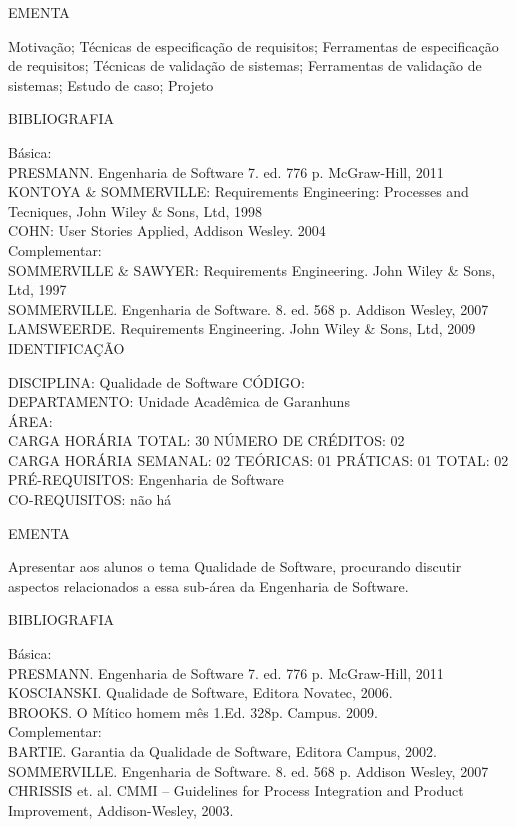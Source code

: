 \documentclass[
	12pt,				%
	openright,			%
  oneside,     %
	a4paper,			%
	chapter=TITLE,		%
	english,			%
	french,				%
	spanish,			%
	brazil				%
	]{abntex2}
\begin{document}
\begin{apendicesenv}
EMENTA 

Motivação; Técnicas de especificação de requisitos; Ferramentas de especificação de requisitos; Técnicas de validação de sistemas; Ferramentas de validação de sistemas; Estudo de caso; Projeto

BIBLIOGRAFIA 

Básica:\\
PRESMANN. Engenharia de Software 7. ed. 776 p. McGraw-Hill, 2011\\
KONTOYA \& SOMMERVILLE: Requirements Engineering: Processes and
Tecniques, John Wiley \& Sons, Ltd, 1998\\
COHN: User Stories Applied, Addison Wesley. 2004\\
Complementar:\\
SOMMERVILLE \& SAWYER: Requirements Engineering. John Wiley \& Sons,
Ltd, 1997 \\
SOMMERVILLE. Engenharia de Software. 8. ed. 568 p. Addison Wesley, 2007\\
LAMSWEERDE. Requirements Engineering. John Wiley \& Sons, Ltd, 2009\\

\newpage IDENTIFICAÇÃO

DISCIPLINA: Qualidade de Software CÓDIGO:\\ 
DEPARTAMENTO: Unidade Acadêmica de Garanhuns\\
ÁREA: \\
CARGA HORÁRIA TOTAL: 30 NÚMERO DE CRÉDITOS: 02\\
CARGA HORÁRIA SEMANAL: 02 TEÓRICAS: 01 PRÁTICAS: 01 TOTAL: 02\\
PRÉ-REQUISITOS: Engenharia de Software\\
CO-REQUISITOS: não há

EMENTA 

Apresentar aos alunos o tema Qualidade de Software, procurando discutir
aspectos relacionados a essa sub-área da Engenharia de Software.

BIBLIOGRAFIA 

Básica:\\
PRESMANN. Engenharia de Software 7. ed. 776 p. McGraw-Hill, 2011\\
KOSCIANSKI. Qualidade de Software, Editora Novatec, 2006.\\
BROOKS. O Mítico homem mês 1.Ed. 328p. Campus. 2009.\\
Complementar:\\
BARTIE. Garantia da Qualidade de Software, Editora Campus, 2002.\\
SOMMERVILLE. Engenharia de Software. 8. ed. 568 p. Addison Wesley, 2007\\
CHRISSIS et. al. CMMI -- Guidelines for Process Integration and Product
Improvement, Addison-Wesley, 2003.


\end{apendicesenv}
\end{document}
